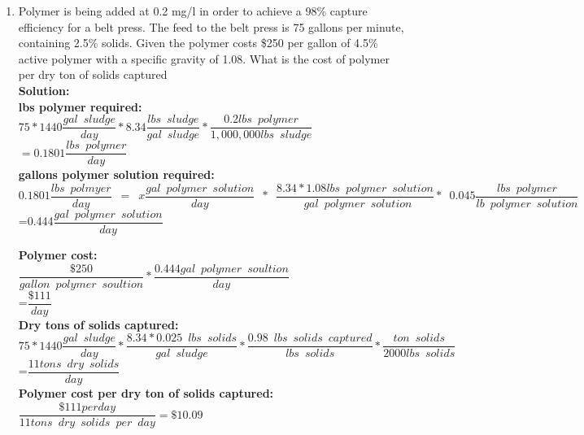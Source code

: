\begin{enumerate}

\item Polymer is being added at 0.2 mg/l in order to achieve a 98\% capture efficiency for a belt press.  The feed to the belt press is 75 gallons per minute, containing 2.5\% solids.  Given the polymer costs \$250 per gallon of 4.5\% active polymer with a specific gravity of 1.08.  What is the cost of polymer per dry ton of solids captured  \\
\vspace{0.25cm}
\textbf{Solution:}\\
\vspace{0.25cm}
\textbf{lbs polymer required:}\\
$75*1440 \dfrac{gal \enspace sludge}{day}* 8.34 \dfrac{lbs \enspace sludge}{gal \enspace sludge} *\dfrac{0.2lbs \enspace polymer}{1,000,000 lbs \enspace sludge}$\\
\vspace{0.25cm}
$= 0.1801 \dfrac{lbs \enspace polymer}{day}$\\

\vspace{0.25cm}
\textbf{gallons polymer solution required:}\\ $0.1801 \dfrac{lbs \enspace polmyer}{day}\enspace=\enspace x \dfrac{gal \enspace polymer \enspace solution}{day} \enspace * \enspace \dfrac{8.34*1.08lbs \enspace polymer \enspace solution}{\enspace gal \enspace polymer \enspace solution}* \enspace 0.045 \dfrac{lbs \enspace polymer}{lb \enspace polymer \enspace solution}$\\
\vspace{0.25cm}
=0.444$\dfrac{gal \enspace polymer \enspace solution}{day}$
\vspace{0.25cm}

\textbf{Polymer cost:}\\
$\dfrac{\$250}{gallon \enspace polymer \enspace soultion}*\dfrac{0.444 gal \enspace polymer \enspace soultion}{day}$\\
\vspace{0.25cm}
=$\dfrac{\$111}{day}$\\
\vspace{0.25cm}
\textbf{Dry tons of solids captured:}\\
$ 75*1440\dfrac{gal \enspace sludge}{day}*\dfrac{8.34*0.025\enspace lbs \enspace solids}{gal \enspace sludge}*\dfrac{0.98\enspace lbs \enspace solids \enspace captured}{lbs \enspace solids}*\dfrac{ton \enspace solids}{2000 lbs \enspace solids}$\\
=$\dfrac{11tons \enspace dry \enspace solids}{day}$\\
\vspace{0.25cm}
\textbf{Polymer cost per dry ton of solids captured:}\\
\vspace{0.25cm}
$\dfrac{\$111 per day}{11 tons \enspace dry \enspace solids \enspace per \enspace day}= \boxed{\$10.09}$


\end{enumerate}
